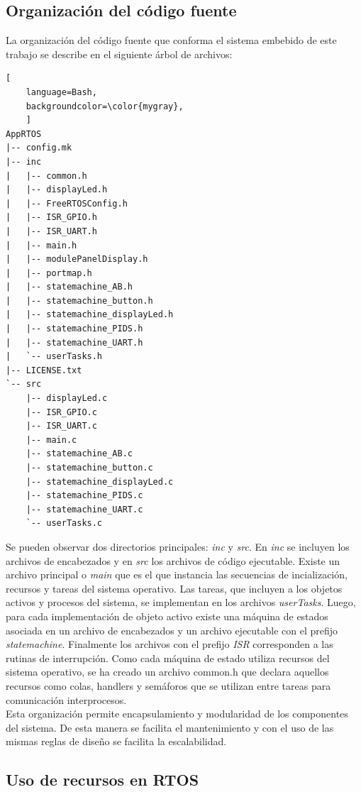 \subsection{Organización del código fuente}
La organización del código fuente que conforma el sistema embebido de este trabajo se describe en el siguiente árbol de archivos:

\begin{lstlisting}[
	language=Bash, 
	backgroundcolor=\color{mygray},
	]
AppRTOS
|-- config.mk
|-- inc
|   |-- common.h
|   |-- displayLed.h
|   |-- FreeRTOSConfig.h
|   |-- ISR_GPIO.h
|   |-- ISR_UART.h
|   |-- main.h
|   |-- modulePanelDisplay.h
|   |-- portmap.h
|   |-- statemachine_AB.h
|   |-- statemachine_button.h
|   |-- statemachine_displayLed.h
|   |-- statemachine_PIDS.h
|   |-- statemachine_UART.h
|   `-- userTasks.h
|-- LICENSE.txt
`-- src
    |-- displayLed.c
    |-- ISR_GPIO.c
    |-- ISR_UART.c
    |-- main.c
    |-- statemachine_AB.c
    |-- statemachine_button.c
    |-- statemachine_displayLed.c
    |-- statemachine_PIDS.c
    |-- statemachine_UART.c
    `-- userTasks.c
\end{lstlisting}

Se pueden observar dos directorios principales: \textit{inc} y \textit{src}. En \textit{inc} se incluyen los archivos de encabezados y en \textit{src} los archivos de código ejecutable. Existe un archivo principal o \textit{main} que es el que instancia las secuencias de incialización, recursos y tareas del sistema operativo. Las tareas, que incluyen a los objetos activos y procesos del sistema, se implementan en los archivos \textit{userTasks}. Luego, para cada implementación de objeto activo existe una máquina de estados asociada en un archivo de encabezados y un archivo ejecutable con el prefijo \textit{statemachine}. Finalmente los archivos con el prefijo \textit{ISR} corresponden a las rutinas de interrupción. Como cada máquina de estado utiliza recursos del sistema operativo, se ha creado un archivo common.h que declara aquellos recursos como colas, handlers y semáforos que se utilizan entre tareas para comunicación interprocesos.\\

Esta organización permite encapsulamiento y modularidad de los componentes del sistema. De esta manera se facilita el mantenimiento y con el uso de las mismas reglas de diseño se facilita la escalabilidad.\\

\subsection{Uso de recursos en RTOS}

